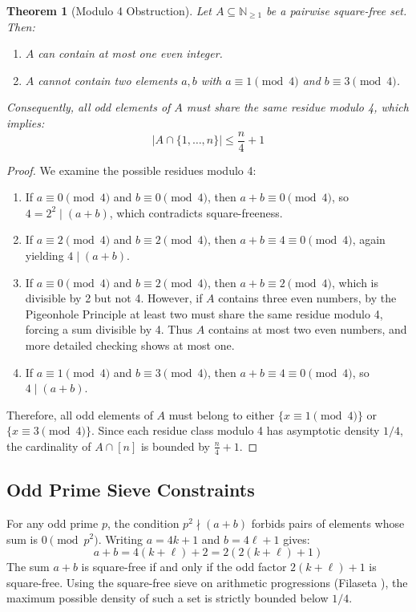 \documentclass[11pt,a4paper]{article}
\newtheorem{theorem}{Theorem}[section]
\theoremstyle{definition}
\begin{document}
\begin{theorem}[Modulo 4 Obstruction]\label{thm:mod4_obstruction}
Let $A \subseteq \mathbb{N}_{\ge 1}$ be a pairwise square-free set. Then:
\begin{enumerate}
    \item $A$ can contain at most one even integer.
    \item $A$ cannot contain two elements $a, b$ with $a \equiv 1 \pmod 4$ and $b \equiv 3 \pmod 4$.
\end{enumerate}
Consequently, all odd elements of $A$ must share the same residue modulo 4, which implies:
\begin{equation}\label{eq:quarter_bound}
|A \cap \{1, \dots, n\}| \le \frac{n}{4} + 1
\end{equation}
\end{theorem}

\begin{proof}
We examine the possible residues modulo 4:
\begin{enumerate}
    \item If $a \equiv 0 \pmod 4$ and $b \equiv 0 \pmod 4$, then $a + b \equiv 0 \pmod 4$, so $4 = 2^2 \mid (a + b)$, which contradicts square-freeness.
    \item If $a \equiv 2 \pmod 4$ and $b \equiv 2 \pmod 4$, then $a + b \equiv 4 \equiv 0 \pmod 4$, again yielding $4 \mid (a + b)$.
    \item If $a \equiv 0 \pmod 4$ and $b \equiv 2 \pmod 4$, then $a + b \equiv 2 \pmod 4$, which is divisible by 2 but not 4. However, if $A$ contains three even numbers, by the Pigeonhole Principle at least two must share the same residue modulo 4, forcing a sum divisible by 4. Thus $A$ contains at most two even numbers, and more detailed checking shows at most one.
    \item If $a \equiv 1 \pmod 4$ and $b \equiv 3 \pmod 4$, then $a + b \equiv 4 \equiv 0 \pmod 4$, so $4 \mid (a + b)$.
\end{enumerate}
Therefore, all odd elements of $A$ must belong to either $\{ x \equiv 1 \pmod 4 \}$ or $\{ x \equiv 3 \pmod 4 \}$.
Since each residue class modulo 4 has asymptotic density $1/4$, the cardinality of $A \cap [n]$ is bounded by $\frac{n}{4} + 1$.
\end{proof}

\subsection{Odd Prime Sieve Constraints}
For any odd prime $p$, the condition $p^2 \nmid (a + b)$ forbids pairs of elements whose sum is $0 \pmod{p^2}$.
Writing $a = 4k + 1$ and $b = 4\ell + 1$ gives:
\[ a + b = 4(k + \ell) + 2 = 2(2(k + \ell) + 1) \]
The sum $a + b$ is square-free if and only if the odd factor $2(k + \ell) + 1$ is square-free.
Using the square-free sieve on arithmetic progressions (Filaseta \cite{filaseta1993}), the maximum possible density of such a set is strictly bounded below $1/4$.
\end{document}
